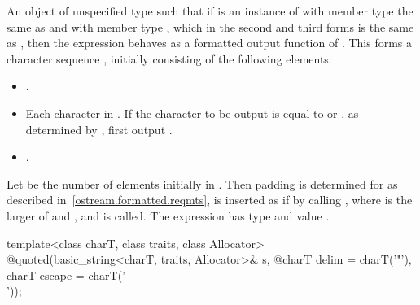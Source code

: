 \begin{itemdescr}
\pnum
\returns
An object of unspecified type such that if  is an instance
of  with member type  the same as
 and with member type , which in the second and third
forms is the same as , then the expression
behaves as a formatted output function
of . This forms a character sequence , initially
consisting of the following elements:
\begin{itemize}
\item {}.
\item Each character in . If the character to be output is equal to
 or , as determined by , first
output .
\item {}.
\end{itemize}
Let  be the number of elements initially in .
Then padding is determined for  as described
in~\ref{ostream.formatted.reqmts},  is inserted as if by calling
, where  is the larger of
 and , and  is called.
The expression  has type
 and value .
\end{itemdescr}

%
\begin{itemdecl}
template<class charT, class traits, class Allocator>
  @\unspec@ quoted(basic_string<charT, traits, Allocator>& s,
  @\itcorr@                   charT delim = charT('"'), charT escape = charT('\\'));
\end{itemdecl}

